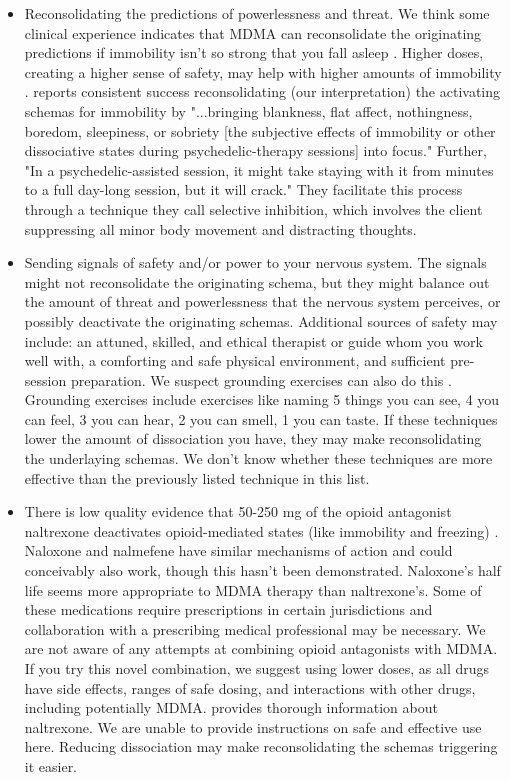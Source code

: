 \documentclass[12pt,letterpaper]{book}
\begin{document}
\begin{itemize}
	\item Reconsolidating the predictions of powerlessness and threat. We think some clinical experience indicates that MDMA can reconsolidate the originating predictions if immobility isn't so strong that you fall asleep \cite{razviPSIP}. Higher doses, creating a higher sense of safety, may help with higher amounts of immobility \cite{regan2021Connection}. \textcite{razviPSIP} reports consistent success reconsolidating (our interpretation) the activating schemas for immobility by "...bringing blankness, flat affect, nothingness, boredom, sleepiness, or sobriety [the subjective effects of immobility or other dissociative states during psychedelic-therapy sessions] into focus." Further, "In a psychedelic-assisted session, it might take staying with it from minutes to a full day-long session, but it will crack." They facilitate this process through a technique they call selective inhibition, which involves the client suppressing all minor body movement and distracting thoughts.
	\item Sending signals of safety and/or power to your nervous system. The signals might not reconsolidate the originating schema, but they might balance out the amount of threat and powerlessness that the nervous system perceives, or possibly deactivate the originating schemas. Additional sources of safety may include: an attuned, skilled, and ethical therapist or guide whom you work well with, a comforting and safe physical environment, and sufficient pre-session preparation. We suspect grounding exercises can also do this \cite{fisherGrounding}. Grounding exercises include exercises like naming 5 things you can see, 4 you can feel, 3 you can hear, 2 you can smell, 1 you can taste. If these techniques lower the amount of dissociation you have, they may make reconsolidating the underlaying schemas. We don't know whether these techniques are more effective than the previously listed technique in this list.
	\item There is low quality evidence that 50-250 mg of the opioid antagonist naltrexone deactivates opioid-mediated states (like immobility and freezing) \cite{escamilla2023treatment}. Naloxone and nalmefene have similar mechanisms of action and could conceivably also work, though this hasn't been demonstrated. Naloxone's half life seems more appropriate to MDMA therapy than naltrexone's. Some of these medications require prescriptions in certain jurisdictions and collaboration with a prescribing medical professional may be necessary. We are not aware of any attempts at combining opioid antagonists with MDMA. If you try this novel combination, we suggest using lower doses, as all drugs have side effects, ranges of safe dosing, and interactions with other drugs, including potentially MDMA. \textcite{naltrexoneInfo} provides thorough information about naltrexone. We are unable to provide instructions on safe and effective use here. Reducing dissociation may make reconsolidating the schemas triggering it easier.
\end{itemize}
\end{document}
